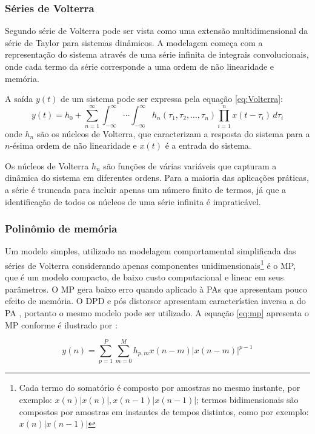 \subsubsection{Séries de Volterra}
Segundo \cite{Gonçalves2009} série de Volterra pode ser vista como uma extensão multidimensional da série de Taylor para sistemas dinâmicos. A modelagem começa com a representação do sistema através de uma série infinita de integrais convolucionais, onde cada termo da série corresponde a uma ordem de não linearidade e memória.

A saída \( y(t) \) de um sistema pode ser expressa pela equação \ref{eq:Volterra}: \begin{equation}
    y(t) = h_0 + \sum_{n=1}^{\infty} \int_{-\infty}^{\infty} \cdots \int_{-\infty}^{\infty} h_n(\tau_1, \tau_2, \ldots, \tau_n) \prod_{i=1}^{n} x(t - \tau_i) \, d\tau_i
    \label{eq:Volterra}
\end{equation} onde \( h_n \) são os núcleos de Volterra, que caracterizam a resposta do sistema para a \( n \)-ésima ordem de não linearidade e \( x(t) \) é a entrada do sistema.

Os núcleos de Volterra \( h_n \) são funções de várias variáveis que capturam a dinâmica do sistema em diferentes ordens. Para a maioria das aplicações práticas, a série é truncada para incluir apenas um número finito de termos, já que a identificação de todos os núcleos de uma série infinita é impraticável.

\subsubsection{Polinômio de memória}

Um modelo simples, utilizado na modelagem comportamental simplificada das séries de Volterra considerando apenas componentes unidimensionais\footnote{Cada termo do somatório é composto por amostras no mesmo instante, por exemplo: $x(n)|x(n)|,x(n - 1)|x(n - 1)|$; termos bidimensionais são compostos por amostras em instantes de tempos distintos, como por exemplo: $x(n)|x(n - 1)|$} é o MP, que é um modelo compacto, de baixo custo computacional e linear em seus parâmetros. O MP gera baixo erro quando aplicado à PAs que apresentam pouco efeito de memória. O DPD e pós distorsor apresentam característica inversa a do PA \cite{Schuartz2017}, portanto o mesmo modelo pode ser utilizado. A equação \ref{eq:mp} apresenta o MP conforme é ilustrado por \cite{Schuartz2017}: 

\begin{equation}
    y(n) = \sum_{p=1}^{P} \sum_{m=0}^{M} h_{p,m} x(n - m) \left| x(n - m) \right|^{p-1}
    \label{eq:mp}
\end{equation}

